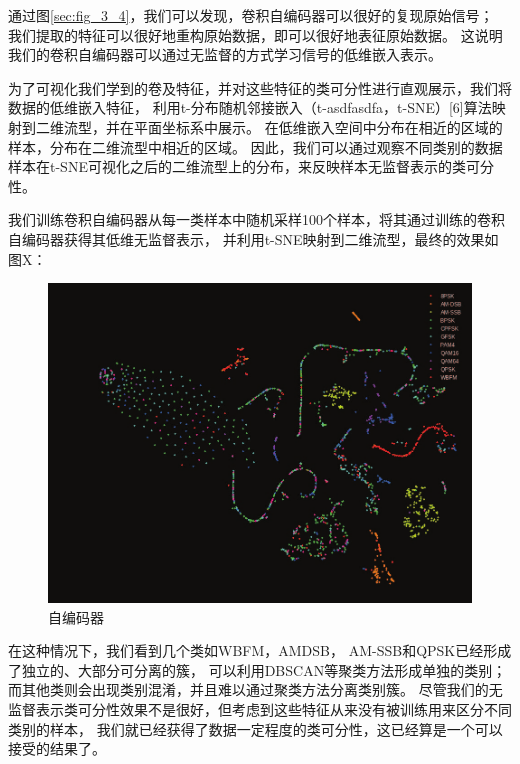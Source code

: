 通过图\ref{sec:fig_3_4}，我们可以发现，卷积自编码器可以很好的复现原始信号；
我们提取的特征可以很好地重构原始数据，即可以很好地表征原始数据。
这说明我们的卷积自编码器可以通过无监督的方式学习信号的低维嵌入表示。\par

为了可视化我们学到的卷及特征，并对这些特征的类可分性进行直观展示，我们将数据的低维嵌入特征，
利用t-分布随机邻接嵌入（t-asdfasdfa，t-SNE）[6]算法映射到二维流型，并在平面坐标系中展示。
在低维嵌入空间中分布在相近的区域的样本，分布在二维流型中相近的区域。
因此，我们可以通过观察不同类别的数据样本在t-SNE可视化之后的二维流型上的分布，来反映样本无监督表示的类可分性。\par

我们训练卷积自编码器从每一类样本中随机采样100个样本，将其通过训练的卷积自编码器获得其低维无监督表示，
并利用t-SNE映射到二维流型，最终的效果如图X：\par

\begin{figure}[!h]
	\centering
	\includegraphics[scale=0.2]{figures/chapter_3/cae_fea}
	\caption{自编码器}	\label{sec:fig_3_5}
\end{figure}

在这种情况下，我们看到几个类如WBFM，AMDSB， AM-SSB和QPSK已经形成了独立的、大部分可分离的簇，
可以利用DBSCAN等聚类方法形成单独的类别；而其他类则会出现类别混淆，并且难以通过聚类方法分离类别簇。 
尽管我们的无监督表示类可分性效果不是很好，但考虑到这些特征从来没有被训练用来区分不同类别的样本，
我们就已经获得了数据一定程度的类可分性，这已经算是一个可以接受的结果了。 \par 

